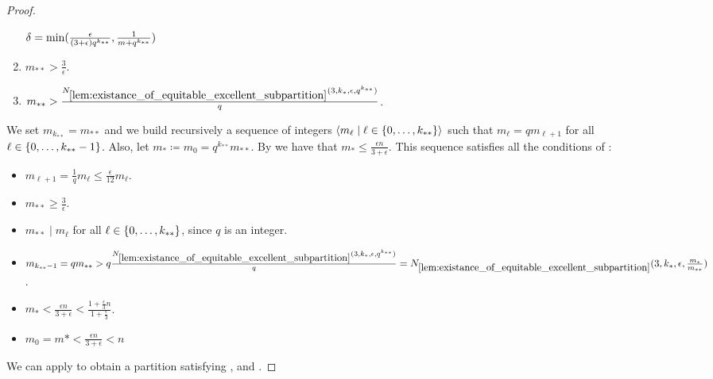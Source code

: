 \begin{theorem}[Theorem 5.18]
\begin{proof}
\begin{enumerate}[label=(\alph*), ref=\alph*]
                    $\delta = \min ( \frac{\epsilon}{( 3 + \epsilon ) q^{k_{**}}}, \frac{1}{m + q^{k_{**}}} )$
                \item \label{itm:minimal_conditions_for_excellent_partitions.b} $m_{**} > \frac{3}{\epsilon}$.
                \item \label{itm:minimal_conditions_for_excellent_partitions.c} $m_{**} > \frac{N_{\ref{lem:existance_of_equitable_excellent_subpartition}}
                    ( 3, k_*, \epsilon, q^{k_{**}} )}{q}$.
            \end{enumerate}
            We set $m_{k_{**}} = m_{**}$ and we build recursively a sequence of integers
            $\left< m_\ell \mid \ell \in \{ 0, \dots, k_{**} \} \right>$ such that $m_\ell = q m_{\ell + 1}$ for all
            $\ell \in \{ 0, \dots, k_{**}-1 \}$.
            Also, let $m_* \coloneqq m_0 = q^{k_{**}} m_{**}$.
            By  we have that $m_* \leq \frac{\epsilon n}{3 + \epsilon}$.
            This sequence satisfies all the conditions of :
            \begin{itemize}[label={}]
                \item {} $m_{\ell+1} = \frac{1}{q} m_\ell \leq \frac{\epsilon}{12} m_\ell$.
                \item {} $m_{**} \geq \frac{3}{\epsilon}$.
                \item {} $m_{**} \mid m_\ell$ for all $\ell \in \{ 0, \dots, k_{**} \}$, since $q$ is an integer.
                \item {} $m_{k_{**}-1} = q m_{**} >
                    q \frac{N_{\ref{lem:existance_of_equitable_excellent_subpartition}}( 3, k_*, \epsilon, q^{k_{**}} )}{q} =
                    N_{\ref{lem:existance_of_equitable_excellent_subpartition}}( 3, k_*, \epsilon, \frac{m_*}{m_{**}} )$.
                \item {} $m_* < \frac{\epsilon n}{3 + \epsilon} < \frac{1 + \frac{\epsilon}{3}n}{1 + \frac{\epsilon}{3}}$.
                \item {} $m_0 = m* < \frac{\epsilon n}{3 + \epsilon} < n$
            \end{itemize}
            We can apply  to obtain a partition
            satisfying ,
             and
            .


\end{proof}
\end{theorem}
